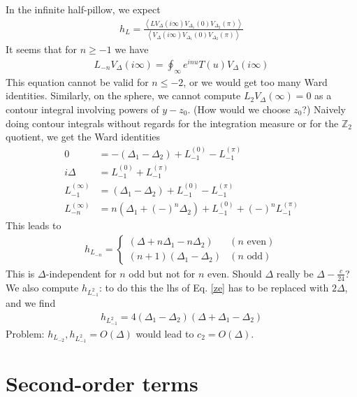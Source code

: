 \documentclass[12pt,a4paper]{article}
\begin{document}
In the infinite half-pillow, we expect
\begin{align}
 h_L = \frac{\left< LV_{\Delta}(i\infty)V_{\Delta_1}(0)V_{\Delta_2}(\pi)\right>}{\left< V_{\Delta}(i\infty)V_{\Delta_1}(0)V_{\Delta_2}(\pi)\right>}
\end{align}
It seems that for $n\geq -1$ we have 
\begin{align}
 L_{-n} V_\Delta(i\infty) = \oint_\infty e^{inu} T(u) V_\Delta(i\infty)
\end{align}
This equation cannot be valid for $n\leq -2$, or we would get too many Ward identities. Similarly, on the sphere, we cannot compute $L_2 V_\Delta(\infty) =0$ as a contour integral involving powers of $y-z_0$. (How would we choose $z_0$?) Naively doing contour integrals without regards for the integration measure or for the $\mathbb{Z}_2$ quotient, we get the Ward identities
\begin{align}
 0 &= -(\Delta_1-\Delta_2) + L_{-1}^{(0)} - L_{-1}^{(\pi)}
 \label{ze}
 \\
 i\Delta &= L_{-1}^{(0)} + L_{-1}^{(\pi)} 
 \\
 L_{-1}^{(\infty)} &= (\Delta_1-\Delta_2) + L_{-1}^{(0)} - L_{-1}^{(\pi)}
 \\
 L_{-n}^{(\infty)} &= n(\Delta_1+(-)^n\Delta_2) + L_{-1}^{(0)} +(-)^n L_{-1}^{(\pi)}
\end{align}
This leads to 
\begin{align}
 h_{L_{-n}} = \left\{\begin{array}{ll} (\Delta+n\Delta_1-n\Delta_2)  & (n \text{ even}) 
                      \\ (n+1)(\Delta_1-\Delta_2) & (n \text{ odd})
                     \end{array}\right.
\end{align}
This is $\Delta$-independent for $n$ odd but not for $n$ even. Should $\Delta$ really be $\Delta-\frac{c}{24}$? We also compute $h_{L_{-1}^2}$: to do this the lhs of Eq. \eqref{ze} has to be replaced with $2\Delta$, and we find 
\begin{align}
 h_{L_{-1}^2} = 4(\Delta_1-\Delta_2)(\Delta+\Delta_1-\Delta_2)
\end{align}
Problem: $h_{L_{-2}},h_{L_{-1}^2} = O(\Delta)$ would lead to $c_2 = O(\Delta)$. 

\section{Second-order terms}
\end{document}
